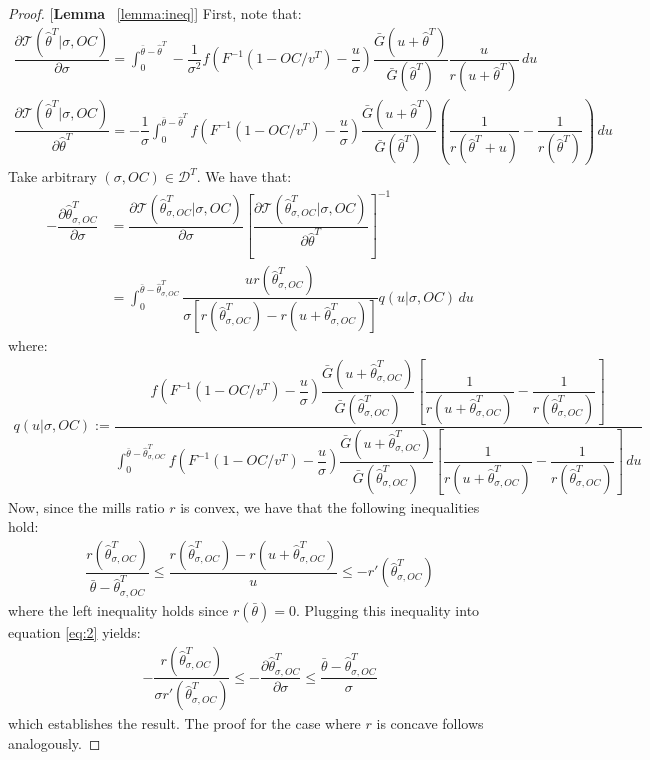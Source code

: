\begin{proof}{[\textbf{Lemma} ~\ref{lemma:ineq}]}
First, note that:
\begin{gather*}
    \dfrac{\partial \mathcal{T}(\hat{\theta}^T|\sigma,OC)}{\partial \sigma} = \int_{0}^{\bar{\theta} - \hat{\theta}^T}-\dfrac{1}{\sigma^2}f\left(F^{-1}(1-OC/v^T)- \dfrac{u}{\sigma}\right)\dfrac{\bar{G}(u+\hat{\theta}^T)}{\bar{G}(\hat{\theta}^T)}\dfrac{u}{r(u+\hat{\theta}^T)} \,du \\
    \dfrac{\partial \mathcal{T}(\hat{\theta}^T|\sigma,OC)}{\partial \hat{\theta}^T} = -\dfrac{1}{\sigma}\int_{0}^{\bar{\theta}-\hat{\theta}^T}f\left(F^{-1}(1-OC/v^T)-\dfrac{u}{\sigma}\right)\dfrac{\bar{G}(u+\hat{\theta}^T)}{\bar{G}(\hat{\theta}^T)}\left(\dfrac{1}{r(\hat{\theta}^T+u)} - \dfrac{1}{r(\hat{\theta}^T)}\right) \,du
\end{gather*}
Take arbitrary $(\sigma,OC)\in \mathcal{D}^T$. We have that:
\begin{align}\label{eq:2}
    -\dfrac{\partial \hat{\theta}^T_{\sigma,OC}}{\partial \sigma} &= \dfrac{\partial \mathcal{T}(\hat{\theta}^T_{\sigma,OC}|\sigma,OC)}{\partial \sigma} \left[\dfrac{\partial \mathcal{T}(\hat{\theta}^T_{\sigma,OC}|\sigma,OC)}{\partial \hat{\theta}^T}\right]^{-1} \\
    &= \int_{0}^{\bar{\theta}-\hat{\theta}^T_{\sigma,OC}}\dfrac{ur(\hat{\theta}^T_{\sigma,OC})}{\sigma[r(\hat{\theta}^T_{\sigma,OC})-r(u+\hat{\theta}^T_{\sigma,OC})]} q(u|\sigma,OC)\,du
\end{align}
where:
\begin{align*}
    q(u|\sigma,OC) := \dfrac{f\left(F^{-1}(1-OC/v^T)-\dfrac{u}{\sigma}\right)\dfrac{\bar{G}(u+\hat{\theta}^T_{\sigma,OC})}{\bar{G}(\hat{\theta}^T_{\sigma,OC})}\left[\dfrac{1}{r(u+\hat{\theta}^T_{\sigma,OC})} - \dfrac{1}{r(\hat{\theta}^T_{\sigma,OC})}\right]}{\int_{0}^{\bar{\theta} - \hat{\theta}^T_{\sigma,OC}} f\left(F^{-1}(1-OC/v^T)-\dfrac{u}{\sigma}\right)\dfrac{\bar{G}(u+\hat{\theta}^T_{\sigma,OC})}{\bar{G}(\hat{\theta}^T_{\sigma,OC})}\left[\dfrac{1}{r(u+\hat{\theta}^T_{\sigma,OC})} - \dfrac{1}{r(\hat{\theta}^T_{\sigma,OC})}\right]\,du}
\end{align*}
Now, since the mills ratio $r$ is convex, we have that the following inequalities hold:
\begin{align*}
    \dfrac{r(\hat{\theta}^T_{\sigma,OC})}{\bar{\theta}-\hat{\theta}^T_{\sigma,OC}}\leq \dfrac{r(\hat{\theta}^T_{\sigma,OC}) - r(u+\hat{\theta}^T_{\sigma,OC})}{u}\leq - r'(\hat{\theta}^T_{\sigma,OC})
\end{align*}
where the left inequality holds since $r(\bar{\theta})=0$. Plugging this inequality into equation \eqref{eq:2} yields:
\begin{align*}
    -\dfrac{r(\hat{\theta}^T_{\sigma,OC})}{\sigma r'(\hat{\theta}^T_{\sigma,OC})}\leq -\dfrac{\partial \hat{\theta}^T_{\sigma,OC}}{\partial \sigma}  \leq \dfrac{\bar{\theta} - \hat{\theta}^T_{\sigma,OC}}{\sigma}
\end{align*}
which establishes the result. The proof for the case where $r$ is concave follows analogously. 
\end{proof}

